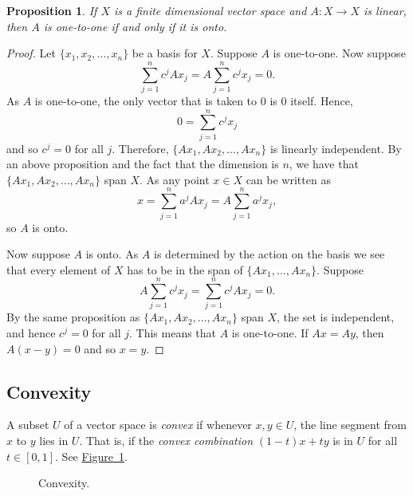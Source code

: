 \documentclass[12pt]{book}
\newcommand{\myindex}[1]{#1\index{#1}}
\theoremstyle{plain}
\newtheorem{prop}[thm]{Proposition}
\theoremstyle{remark}
\theoremstyle{definition}
\theoremstyle{exercise}
\theoremstyle{example}
\newcommand{\figureref}[1]{\hyperref[#1]{Figure~\ref*{#1}}}
\begin{document}
\begin{prop}
If $X$ is a finite dimensional vector space and $A \colon X \to X$
is linear, then $A$ is one-to-one if and only if it is onto.
\end{prop}

\begin{proof}
Let $\{ x_1,x_2,\ldots,x_n \}$ be a basis for $X$.
Suppose $A$ is one-to-one.  Now suppose
\begin{equation*}
\sum_{j=1}^n c^j Ax_j =
A\sum_{j=1}^n c^j x_j =
0 .
\end{equation*}
As $A$ is one-to-one,
the only vector that is taken to 0 is 0 itself.  
Hence,
\begin{equation*}
0 =
\sum_{j=1}^n c^j x_j
\end{equation*}
and so $c^j = 0$ for all $j$.
Therefore, $\{ Ax_1, Ax_2, \ldots, Ax_n \}$ is linearly independent.  By an
above proposition and the fact that the dimension is $n$, we have that
$\{ Ax_1, Ax_2, \ldots, Ax_n \}$ span $X$.  As any point $x \in X$
can be written as
\begin{equation*}
x = \sum_{j=1}^n a^j Ax_j =
A\sum_{j=1}^n a^j x_j ,
\end{equation*}
so $A$ is onto.

Now suppose $A$ is onto.  As $A$ is determined by the action on
the basis we see that every element of $X$ has to be in the span of
$\{ Ax_1, \ldots, Ax_n \}$.  Suppose 
\begin{equation*}
A\sum_{j=1}^n c^j x_j =
\sum_{j=1}^n c^j Ax_j = 0 .
\end{equation*}
By the same proposition as 
$\{ Ax_1, Ax_2, \ldots, Ax_n \}$ span $X$, the set is independent,
and hence $c^j = 0$ for all $j$.  This means that
$A$ is one-to-one.  If $Ax = Ay$, then $A(x-y) = 0$ and so
$x=y$.
\end{proof}

\subsection{Convexity}

A subset $U$ of a vector space is \emph{\myindex{convex}}
if whenever $x,y \in U$, the line segment from
$x$ to $y$ lies in $U$.  That is, if the \emph{\myindex{convex combination}}
$(1-t)x+ty$ is in $U$ for all $t \in [0,1]$.  See \figureref{mv:convexcomb}.

\begin{figure}[h!t]
\begin{center}

\caption{Convexity.\label{mv:convexcomb}}
\end{center}
\end{figure}
\end{document}
